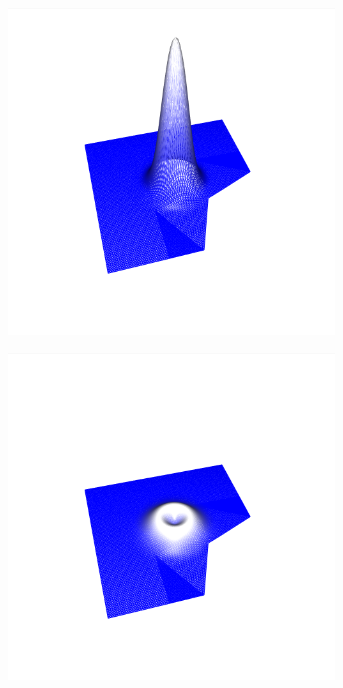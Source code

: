 \documentclass[crop=false,10pt,ngerman]{standalone}
\begin{document}
      \begin{figure}[h]
        \center
        \begin{subfigure}[b]{0.24\textwidth}
          \center
          \includegraphics[trim={4cm 1.2cm 4.5cm 1.5cm},clip,width=0.95\textwidth]{images/test_wave_0.png}
          \caption{}
        \end{subfigure}
        \begin{subfigure}[b]{0.24\textwidth}
          \center
          \includegraphics[trim={4cm 1.2cm 4.5cm 1.5cm},clip,width=0.95\textwidth]{images/test_wave_1.png}

\end{subfigure}
\end{figure}
\end{document}
